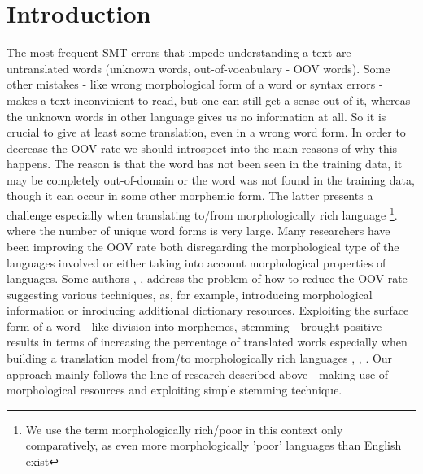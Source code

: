 \documentclass[11pt,letterpaper]{article}
\begin{document}
\section{Introduction}
The most frequent SMT errors that impede understanding a text 
are untranslated words (unknown words, out-of-vocabulary - OOV words). Some other mistakes - like
wrong morphological form of a word or syntax errors - makes a text inconvinient to read, but one
can still get a sense out of it, whereas the unknown words in other language gives us no information at all.
So it is crucial to give at least some translation, even in a wrong word form. %
In order to decrease the OOV rate we should introspect into the main reasons of why this happens. 
The reason is that the word has not been seen in the training data, it may be completely out-of-domain
or the word was not found in the training data, though it can occur in some other morphemic form.
The latter presents a challenge especially when translating to/from morphologically rich language
\footnote{We use the term morphologically rich/poor in this context only comparatively, as 
even more morphologically 'poor' languages than English exist}.
where the number of unique word forms is very large. %
Many researchers have been improving the OOV rate both disregarding the morphological type
of the languages involved or either taking into account morphological properties of languages. 
Some authors \cite{habash}, \cite{turchi}, \cite{bojartamchyna} address the problem of how to reduce the OOV 
rate suggesting
various techniques, as, for example, introducing morphological information or inroducing additional dictionary
resources. 
Exploiting the surface form of a word - like division into morphemes, stemming - brought
positive results in terms of increasing the percentage of translated words 
especially when building a translation  model from/to morphologically rich languages \cite{popovic},
\cite{oflazer}, \cite{gispert}.  
Our approach mainly follows the line of research described above - making use of 
morphological resources and exploiting simple stemming technique.
\end{document}
